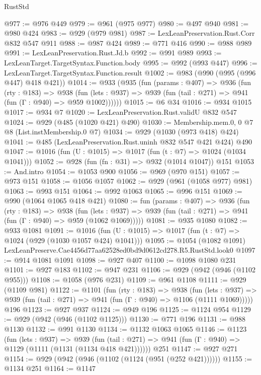 \begin{lexlean}{RustStd}
\begin{coremodule}
@977 := @976 @449
@979 := @961 (@975 @977)
@980 := @497 @940
@981 := @980 @424
@983 := @929 (@979 @981)
@987 := LexLeanPreservation.Rust.Corr @832 @547 @911
@988 := @987 @424
@989 := @771 @416
@990 := @988 @989
@991 := LexLeanPreservation.Rust.Jd.b
@992 := @991 @989
@993 := LexLeanTarget.TargetSyntax.Function.body
@995 := @992 (@993 @447)
@996 := LexLeanTarget.TargetSyntax.Function.result
@1002 := @983 (@990 (@995 (@996 @447) @418 @421))
@1014 := @933
    (@935
      (fun (params : @407) =>
      @936
        (fun (rty : @183) =>
        @938
          (fun (lets : @937) => @939 (fun (tail : @271) => @941 (fun (Γ : @940) => @959 @1002))))))
@1015 := @6 @34
@1016 := @934 @1015
@1017 := @934 @7
@1020 := LexLeanPreservation.Rust.validU @832 @547
@1024 := @929 (@485 (@1020 @421) @490)
@1030 := Membership.mem.{0, 0} @7 @8 (List.instMembership.{0} @7)
@1034 := @929 (@1030 (@973 @418) @424)
@1041 := @485 (LexLeanPreservation.Rust.uninh @832 @547 @421 @424) @490
@1047 := @1016 (fun (U : @1015) => @1017 (fun (t : @7) => @1024 (@1034 @1041)))
@1052 := @928 (fun (fn : @31) => @932 (@1014 @1047)) @151
@1053 := And.intro
@1054 := @1053 @900
@1056 := @969 (@970 @151)
@1057 := @973 @151
@1058 := @1056 @1057
@1062 := @929 (@961 (@1058 @977) @981)
@1063 := @993 @151
@1064 := @992 @1063
@1065 := @996 @151
@1069 := @990 (@1064 @1065 @418 @421)
@1080 := fun (params : @407) =>
  @936
    (fun (rty : @183) =>
    @938
      (fun (lets : @937) =>
      @939 (fun (tail : @271) => @941 (fun (Γ : @940) => @959 (@1062 @1069)))))
@1081 := @935 @1080
@1082 := @933 @1081
@1091 := @1016 (fun (U : @1015) => @1017 (fun (t : @7) => @1024 (@929 (@1030 @1057 @424) @1041)))
@1095 := @1054 (@1082 @1091) LexLeanPreserve.Cae4456d77aa62528ed0bd9d0612cd278.R5.RustStd.look0
@1097 := @914 @1081 @1091
@1098 := @927 @407
@1100 := @1098 @1080 @231
@1101 := @927 @183
@1102 := @947 @231
@1106 := @929 (@942 (@946 (@1102 @955)))
@1108 := @1058 (@976 @231)
@1109 := @961 @1108
@1111 := @929 (@1109 @981)
@1122 := @1101
    (fun (rty : @183) =>
    @938
      (fun (lets : @937) =>
      @939 (fun (tail : @271) => @941 (fun (Γ : @940) => @1106 (@1111 @1069)))))
    @196
@1123 := @927 @937
@1124 := @949 @196
@1125 := @1124 @954
@1129 := @929 (@942 (@946 (@1102 @1125)))
@1130 := @771 @196
@1131 := @988 @1130
@1132 := @991 @1130
@1134 := @1132 @1063 @1065
@1146 := @1123
    (fun (lets : @937) =>
    @939 (fun (tail : @271) => @941 (fun (Γ : @940) => @1129 (@1111 (@1131 (@1134 @418 @421))))))
    @251
@1147 := @927 @271
@1154 := @929 (@942 (@946 (@1102 (@1124 (@951 (@252 @421))))))
@1155 := @1134 @251
@1164 := @1147

\end{coremodule}
\end{lexlean}

